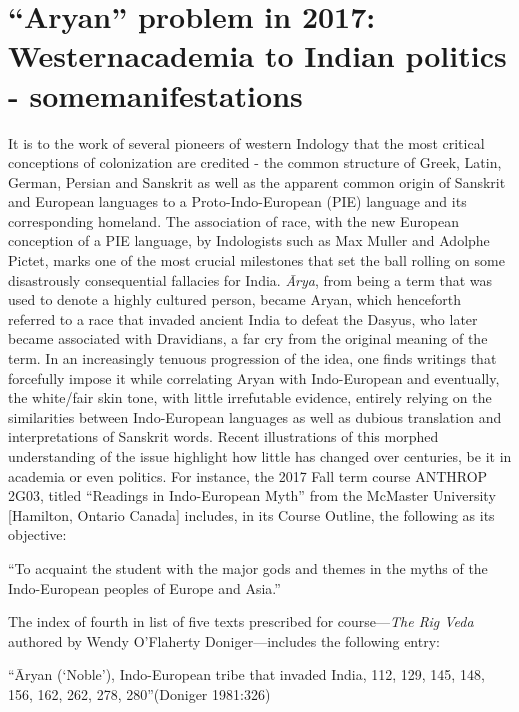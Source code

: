 \section{“Aryan” problem in 2017: Western\hfill \break academia to Indian politics - some\hfill \break manifestations}

It is to the work of several pioneers of western Indology that the most critical conceptions of colonization are credited - the common structure of Greek, Latin, German, Persian and Sanskrit as well as the apparent common origin of Sanskrit and European languages to a Proto-Indo-European (PIE) language and its corresponding homeland. The association of race, with the new European conception of a PIE language, by Indologists such as Max Muller and Adolphe Pictet, marks one of the most crucial milestones that set the ball rolling on some disastrously consequential fallacies for India. \textit{Ārya}, from being a term that was used to denote a highly cultured person, became Aryan, which henceforth referred to a race that invaded ancient India to defeat the Dasyus, who later became associated with Dravidians, a far cry from the original meaning of the term. In an increasingly tenuous progression of the idea, one finds writings that forcefully impose it while correlating Aryan with Indo-European and eventually, the white/fair skin tone, with little irrefutable evidence, entirely relying on the similarities between Indo-European languages as well as dubious translation and interpretations of Sanskrit words. Recent illustrations of this morphed understanding of the issue highlight how little has changed over centuries, be it in academia or even politics. For instance, the 2017 Fall term course ANTHROP 2G03, titled “Readings in Indo-European Myth” from the McMaster University [Hamilton, Ontario Canada] includes, in its Course Outline, the following as its objective:

\begin{myquote}
“To acquaint the student with the major gods and themes in the myths of the Indo-European peoples of Europe and Asia.”
\end{myquote}

The index of fourth in list of five texts prescribed for course—\textit{The Rig Veda} authored by Wendy O'Flaherty Doniger—includes the following entry:

\begin{myquote}
“Āryan (‘Noble’), Indo-European tribe that invaded India, 112, 129, 145, 148, 156, 162, 262, 278, 280”\hfill (Doniger 1981:326)
\end{myquote}

